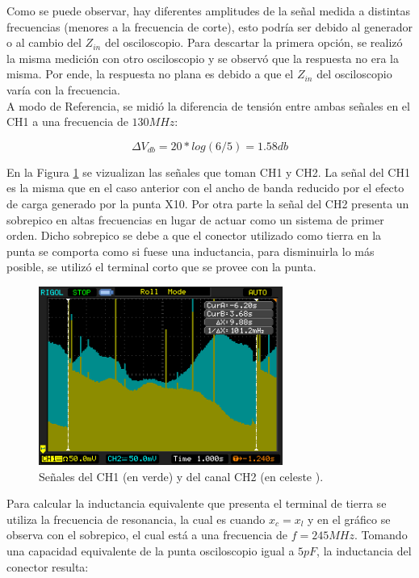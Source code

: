 \documentclass[a4paper,10pt]{article}
\begin{document}
		\indent Como se puede observar, hay diferentes amplitudes de la señal
		medida a distintas frecuencias (menores a la frecuencia de corte), 
		esto podría ser debido al generador o al cambio del $Z_{in}$ del 
		osciloscopio. Para descartar la primera opción, se realizó la misma
		medición con otro osciloscopio y se observó que la respuesta no era la
		misma. Por ende, la respuesta no plana es debido a que el $Z_{in}$ del
		osciloscopio varía con la frecuencia.\\
		\indent A modo de Referencia, se midió la diferencia de tensión entre
		ambas señales en el CH1 a una frecuencia de $130MHz$:

		\begin{equation*}
			\Delta V_{db} = 20*log(6/5) = 1.58 db 
		\end{equation*}

		\indent En la Figura \ref{img000} se vizualizan las se\~nales que 
		toman CH1 y CH2. La se\~nal del CH1 es la misma que en el caso 
		anterior con el ancho de banda reducido por el efecto de carga 
		generado por la punta X10. Por otra parte la se\~nal del CH2 presenta
		un sobrepico en altas frecuencias en lugar de actuar como un sistema 
		de primer orden. Dicho sobrepico se debe a que el conector utilizado 
		como tierra en la punta se comporta como si fuese una inductancia, 
		para disminuirla lo más posible, se utilizó el terminal corto que
		se provee con la punta. \\
		
		\begin{figure}[!htb]
			\centering
			\includegraphics[width=8cm]
			{Imagenes/Mediciones instrumentos/NewFile0.png}
			\caption{Se\~nales del CH1 (en verde) y del canal CH2 (en celeste
			).} \label{img000}
		\end{figure}

		\indent Para calcular la inductancia equivalente que presenta el 
		terminal de tierra se utiliza la frecuencia de resonancia, la cual 
		es cuando $x_c = x_l$ y en el gráfico se observa con el sobrepico, el
		cual está a una frecuencia de $f = 245 MHz$. Tomando una capacidad 
		equivalente de la punta osciloscopio igual a $5pF$, la inductancia 
		del conector resulta:
\end{document}
